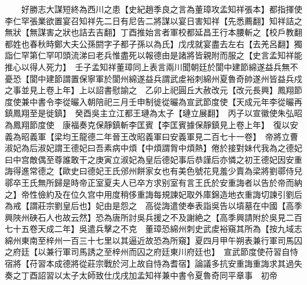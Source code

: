 　　好勝志大謀短終為西川之患【史紀趙季良之言為董璋攻孟知祥張本】都指揮使李仁罕張業欲置宴召知祥先二日有尼告二將謀以宴日害知祥【先悉薦翻】知祥詰之無狀【無謀害之狀也詰去吉翻】丁酉推始言者軍校都延昌王行本腰斬之【校戶教翻都姓也春秋時鄭大夫公孫閼字子都子孫以為氏】戊戌就宴盡去左右【去羌呂翻】獨詣仁罕第仁罕叩頭流涕曰老兵惟盡死以報德由是諸將皆親附而服之【史言孟知祥能推心以得人死力】　壬子孟知祥董璋同上表言兩川聞朝廷於閬中建節綿遂益兵無不憂恐【閬中建節謂置保寧軍於閬州綿遂益兵謂武䖍裕刺綿州夏魯奇帥遂州皆益兵戍之事並見上卷上年】上以詔書慰諭之　乙卯上祀圓丘大赦改元【改元長興】鳳翔節度使兼中書令李從曮入朝陪祀三月壬申制徙從曮為宣武節度使【天成元年李從曮再鎮鳳翔至是徙鎮】　癸酉吳主立江都王璉為太子【璉立展翻】　丙子以宣徽使朱弘昭為鳳翔節度使　康福奏克保靜鎮斬李匡賓【李匡賓據保靜鎮見上卷上年】　復以安義為昭義軍【梁均王龍德二年晉王改昭義軍曰安義軍見二百七十一卷】　帝將立曹淑妃為后淑妃謂王德妃曰吾素病中煩【中煩謂胷中煩熱】倦於接對妹代我為之德妃曰中宫敵偶至尊誰敢干之庚寅立淑妃為皇后德妃事后恭謹后亦憐之初王德妃因安重誨得進常德之【歐史曰德妃王氏邠州餅家女也有美色號花見羞少賣為梁將劉鄩侍兒鄩卒王氏無所歸是時帝正室夏夫人已卒方求别室有言王氏於安重誨者以告於帝而納之】帝性儉約及在位久宫中用度稍侈重誨每規諫妃取外庫錦造地衣重誨切諫引劉后為戒【謂莊宗劉皇后也】妃由是怨之　高從誨遣使奉表詣吳告以墳墓在中國【高季興陜州硤石人也故云然】恐為唐所討吳兵援之不及謝絶之【高季興請附於吳見二百七十五卷天成二年】吳遣兵擊之不克　董璋恐綿州刺史武䖍裕窺其所為【按九域志綿州東南至梓州一百三十七里以其逼近故恐為所窺】夏四月甲午朔表兼行軍司馬囚之府廷【以兼行軍司馬誘之至梓州而囚之府廷東川府廷也】　宣武節度使苻習自恃宿將【苻習本成德將從莊宗戰於河上故自恃為耆宿】論議多抗安重誨重誨求其過失奏之丁酉詔習以太子太師致仕戊戌加孟知祥兼中書令夏魯奇同平章事　初帝

